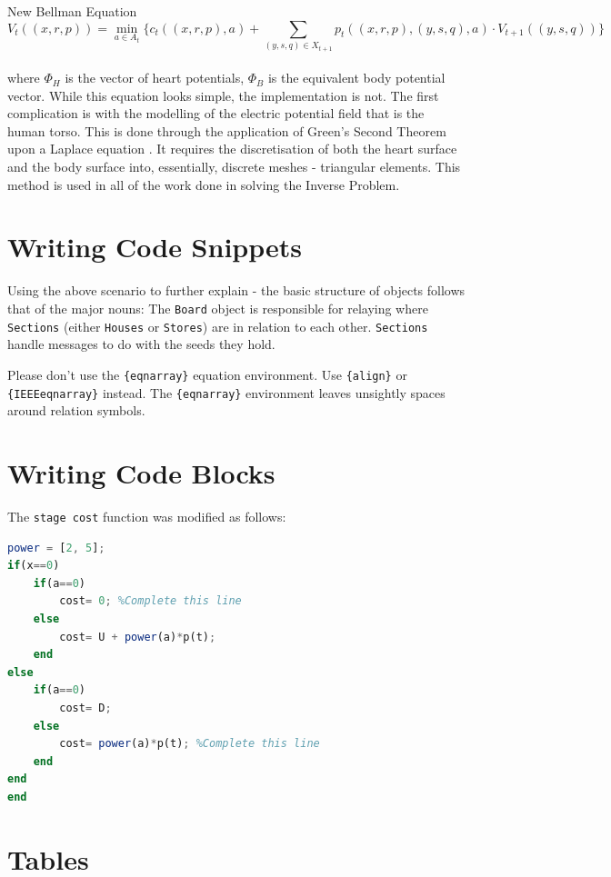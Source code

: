 \documentclass[10pt,a4paper,conference]{IEEEtran}
\begin{document}
	New Bellman Equation
	\begin{equation*}
	V_{t}((x,r,p))
	= \min_{a \in A_{t}}
	 \bigg\{ c_{t}((x,r,p),a)
			+ \sum_{(y,s,q) \in X_{t+1}} p_{t} ((x,r,p), (y,s,q), a) \cdot V_{t+1}((y,s,q)) \bigg\}
				\end{equation*}\\


where $\Phi_H$ is the vector of heart potentials, $\Phi_B$ is the equivalent body potential vector. While this equation looks simple, the implementation is not. The first complication is with the modelling of the electric potential field that is the human torso. This is done through the application of Green's Second Theorem upon a Laplace equation \cite{He2004}. It requires the discretisation of both the heart surface and the body surface into, essentially, discrete meshes - triangular elements. This method is used in all of the work done in solving the Inverse Problem.

\section{Writing Code Snippets}

Using the above scenario to further explain - the basic structure of objects follows that of the major nouns: The {\tt Board} object is responsible for relaying where {\tt Sections} (either {\tt Houses} or {\tt Stores}) are in relation to each other. {\tt Sections} handle messages to do with the seeds they hold.

Please don't use the \verb|{eqnarray}| equation environment. Use
\verb|{align}| or \verb|{IEEEeqnarray}| instead. The \verb|{eqnarray}|
environment leaves unsightly spaces around relation symbols.

\section{Writing Code Blocks}
	The {\tt stage cost} function was modified as follows:
		\begin{lstlisting}[language=Octave]
power = [2, 5];
if(x==0)
    if(a==0)
        cost= 0; %Complete this line
    else
        cost= U + power(a)*p(t);
    end
else
    if(a==0)
        cost= D;
    else
        cost= power(a)*p(t); %Complete this line
    end
end
end
		\end{lstlisting}

\section{Tables}
\end{document}
